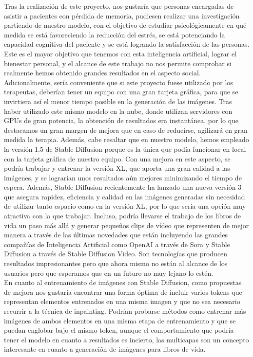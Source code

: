 Tras la realización de este proyecto, nos gustaría que personas encargadas de asistir a pacientes con pérdida de memoria, pudiesen realizar una investigación partiendo de nuestro modelo, con el objetivo de estudiar psicológicamente en qué medida se está favoreciendo la reducción del estrés, se está potenciando la capacidad cognitiva del paciente y se está logrando la satisfacción de las personas. Este es el mayor objetivo que tenemos con esta inteligencia artificial, lograr el bienestar personal, y el alcance de este trabajo no nos permite comprobar si realmente hemos obtenido grandes resultados en el aspecto social.\\

Adicionalmente, sería conveniente que si este proyecto fuese utilizado por los terapeutas, deberían tener un equipo con una gran tarjeta gráfica, para que se invirtiera así el menor tiempo posible en la generación de las imágenes. Tras haber utilizado este mismo modelo en la nube, donde utilizan servidores con GPUs de gran potencia, la obtención de resultados era instantánea, por lo que destacamos un gran margen de mejora que en caso de reducirse, agilizará en gran medida la terapia. Además, cabe resaltar que en nuestro modelo, hemos empleado la versión 1.5 de Stable Diffusion porque es la única que podía funcionar en local con la tarjeta gráfica de nuestro equipo. Con una mejora en este aspecto, se podría trabajar y entrenar la versión XL, que aporta una gran calidad a las imágenes, y se lograrían unos resultados aún mejores minimizando el tiempo de espera.  Además, Stable Diffusion recientemente ha lanzado una nueva versión 3 que asegura rapidez, eficiencia y calidad en las imágenes generadas sin necesidad de utilizar tanto espacio como en la versión XL, por lo que sería una opción muy atractiva con la que trabajar. Incluso, podría llevarse el trabajo de los libros de vida un paso más allá y generar pequeños clips de vídeo que representen de mejor manera a través de las últimas novedades que están incluyendo las grandes compañías de Inteligencia Artificial como OpenAI a través de Sora y Stable Diffusion a través de Stable Diffusion Video. Son tecnologías que producen resultados impresionantes pero que ahora mismo no están al alcance de los usuarios pero que esperamos que en un futuro no muy lejano lo estén. \\

En cuanto al entrenamiento de imágenes con Stable Diffusion, como propuestas de mejora nos gustaría encontrar una forma óptima de incluir varios tokens que representan elementos entrenados en una misma imagen y que no sea necesario recurrir a la técnica de inpainting. Podrían probarse métodos como entrenar más imágenes de ambos elementos en una misma etapa de entrenamiento y que se puedan englobar bajo el mismo token, aunque el comportamiento que podría tener el modelo en cuanto a resultados es incierto, las multicapas son un concepto interesante en cuanto a generación de imágenes para libros de vida. \\


